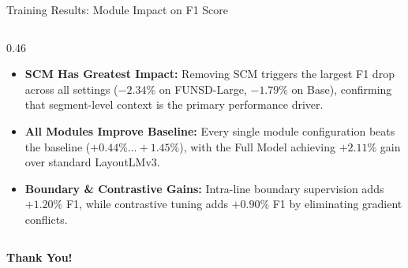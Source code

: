 \documentclass[aspectratio=169,11pt,xcolor={dvipsnames,table}]{beamer}
\begin{document}
\begin{frame}{Training Results: Module Impact on F1 Score}
\begin{columns}[c]
    \begin{column}{0.46\textwidth}
      \footnotesize
      \begin{itemize}\setlength{\itemsep}{4pt}
        \item \textbf{SCM Has Greatest Impact:} Removing SCM triggers the largest F1 drop across all settings ($-2.34\%$ on FUNSD-Large, $-1.79\%$ on Base), confirming that segment-level context is the primary performance driver.
        \item \textbf{All Modules Improve Baseline:} Every single module configuration beats the baseline ($+0.44\% \dots +1.45\%$), with the Full Model achieving $\mathbf{+2.11\%}$ gain over standard LayoutLMv3.
        \item \textbf{Boundary \& Contrastive Gains:} Intra-line boundary supervision adds $+1.20\%$ F1, while contrastive tuning adds $+0.90\%$ F1 by eliminating gradient conflicts.
      \end{itemize}
    \end{column}
  \end{columns}
\end{frame}

\begin{frame}[plain]
  \begin{center}
    \vspace*{1.10cm}
    {\Huge\bfseries\color{PrimaryBlue} Thank You!}\\[0.90cm]
    
  \end{center}
\end{frame}
\end{document}
